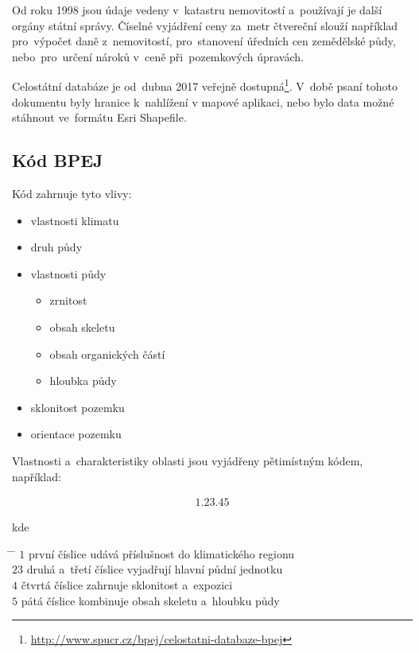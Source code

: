 Od roku 1998 jsou údaje  vedeny v~katastru nemovitostí a~používají je další orgány státní správy. Číselné vyjádření ceny  za~metr čtvereční slouží například pro~výpočet daně z~nemovitostí, pro~stanovení úředních cen zemědělské půdy, nebo~pro~určení nároků v~ceně při~pozemkových úpravách.

Celostátní databáze  je od~dubna 2017 veřejně dostupná\footnote{\url{http://www.spucr.cz/bpej/celostatni-databaze-bpej}}. V~době psaní tohoto dokumentu byly hranice  k~nahlížení v mapové aplikaci, nebo bylo data možné stáhnout ve~formátu Esri Shapefile.

\subsection{Kód BPEJ}
\label{kod_bpej}

Kód  zahrnuje tyto vlivy:
	\begin{itemize}[leftmargin=1.5cm, noitemsep]
		\item vlastnosti klimatu
		\item druh půdy
		\item vlastnosti půdy
			\begin{itemize}[leftmargin=1cm, noitemsep]
				\item zrnitost
				\item obsah skeletu
				\item obsah organických částí
				\item hloubka půdy
			\end{itemize}
		\item sklonitost pozemku
		\item orientace pozemku
	\end{itemize}

Vlastnosti a~charakteristiky oblasti  jsou vyjádřeny pětimístným kódem, například:

\begin{align*}
	1.23.45
\end{align*}

kde
\begin{tabbing}
\hspace{2em} \= \hspace{5em} \= \kill
	\> $1$	\> první číslice udává příslušnost do klimatického regionu \\
	\> $23$	\> druhá a~třetí číslice vyjadřují hlavní půdní jednotku \\
	\> $4$	\> čtvrtá číslice zahrnuje sklonitost a~expozici\\
	\> $5$	\> pátá číslice kombinuje obsah skeletu a~hloubku půdy
\end{tabbing}

